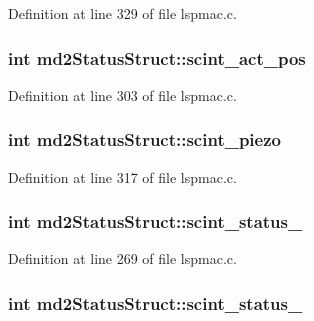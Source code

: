 Definition at line 329 of file lspmac.\-c.

\hypertarget{structmd2StatusStruct_a1c146fc792c4285eed5b2c446c214f98}{
\subsubsection[{scint\-\_\-act\-\_\-pos}]{\setlength{\rightskip}{0pt plus 5cm}int md2\-Status\-Struct\-::scint\-\_\-act\-\_\-pos}}\label{structmd2StatusStruct_a1c146fc792c4285eed5b2c446c214f98}


Definition at line 303 of file lspmac.\-c.

\hypertarget{structmd2StatusStruct_a031be48adfa016c637d6eae49054c435}{
\subsubsection[{scint\-\_\-piezo}]{\setlength{\rightskip}{0pt plus 5cm}int md2\-Status\-Struct\-::scint\-\_\-piezo}}\label{structmd2StatusStruct_a031be48adfa016c637d6eae49054c435}


Definition at line 317 of file lspmac.\-c.

\hypertarget{structmd2StatusStruct_a1723870357f428ac5c2758a2c9a475c7}{
\subsubsection[{scint\-\_\-status\-\_\-1}]{\setlength{\rightskip}{0pt plus 5cm}int md2\-Status\-Struct\-::scint\-\_\-status\-\_}}\label{structmd2StatusStruct_a1723870357f428ac5c2758a2c9a475c7}


Definition at line 269 of file lspmac.\-c.

\hypertarget{structmd2StatusStruct_a4e5bc72e2f4007370f1c29ea272c952f}{
\subsubsection[{scint\-\_\-status\-\_\-2}]{\setlength{\rightskip}{0pt plus 5cm}int md2\-Status\-Struct\-::scint\-\_\-status\-\_}}\label{structmd2StatusStruct_a4e5bc72e2f4007370f1c29ea272c952f}


